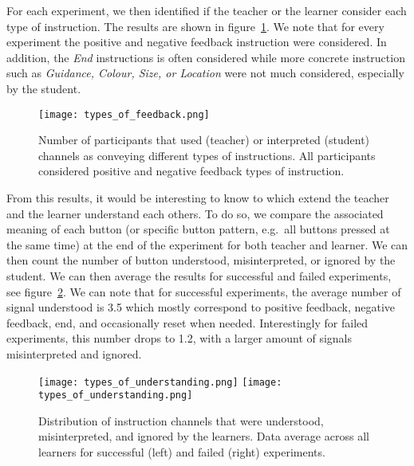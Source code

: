 For each experiment, we then identified if the teacher or the learner consider each type of instruction. The results are shown in figure~\ref{fig:types_of_feedback}. We note that for every experiment the positive and negative feedback instruction were considered. In addition, the \emph{End} instructions is often considered while more concrete instruction such as \emph{Guidance, Colour, Size, or Location} were not much considered, especially by the student.

\begin{figure}[H]
	\begin{center}
   		\texttt{[image: types\_of\_feedback.png]}
   		\caption{Number of participants that used (teacher) or interpreted (student) channels as conveying different types of instructions. All participants considered positive and negative feedback types of instruction.}
    \label{fig:types_of_feedback}
   	\end{center}
\end{figure}

From this results, it would be interesting to know to which extend the teacher and the learner understand each others. To do so, we compare the associated meaning of each button (or specific button pattern, e.g.\ all buttons pressed at the same time) at the end of the experiment for both teacher and learner. We can then count the number of button understood, misinterpreted, or ignored by the student. We can then average the results for successful and failed experiments, see figure~\ref{fig:types_of_understanding}.
We can note that for successful experiments, the average number of signal understood is 3.5 which mostly correspond to positive feedback, negative feedback, end, and occasionally reset when needed. Interestingly for failed experiments, this number drops to 1.2, with a larger amount of signals misinterpreted and ignored.

\begin{figure}[H]
	\begin{center}
   		\texttt{[image: types\_of\_understanding.png]}
   		\texttt{[image: types\_of\_understanding.png]}
   		\caption{Distribution of instruction channels that were understood, misinterpreted, and ignored by the learners. Data average across all learners for successful (left) and failed (right) experiments.}
    \label{fig:types_of_understanding}
   	\end{center}
\end{figure}

